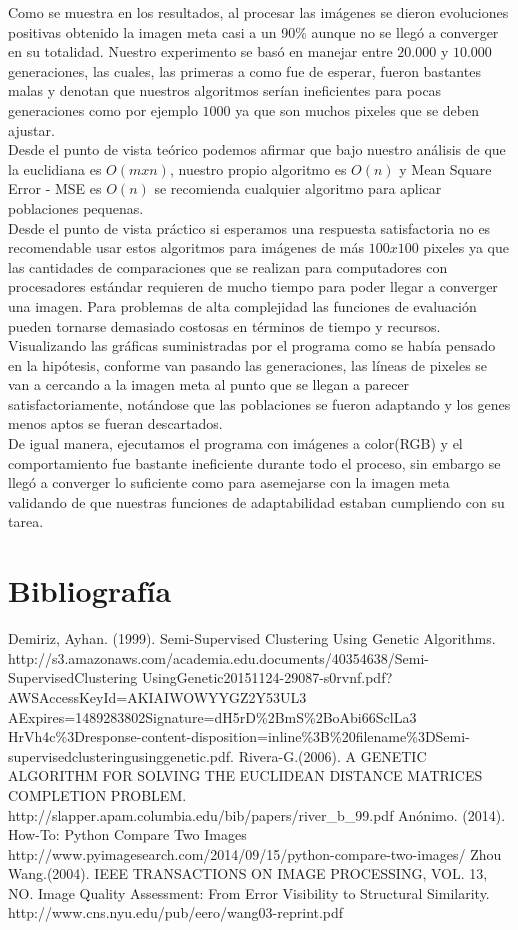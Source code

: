 \documentclass[letterpaper, 10 pt, conference]{ieeeconf}  %
\begin{document}
\setlength{\parindent}{1cm}Como se muestra en los resultados, al procesar las im\'agenes se dieron evoluciones positivas obtenido la imagen meta casi a un 90\%  aunque no se lleg\'o a converger en su totalidad. Nuestro experimento se bas\'o en manejar entre $20.000$ y $10.000$ generaciones, las cuales, las primeras a como fue de esperar, fueron bastantes malas y denotan que nuestros algoritmos ser\'ian ineficientes para pocas generaciones como por ejemplo $1000$ ya que son muchos pixeles que se deben ajustar. \\
\indent Desde el punto de vista te\'orico podemos afirmar que bajo nuestro análisis de que la euclidiana es $O(mxn)$, nuestro propio algoritmo es $O(n)$ y Mean Square Error - MSE es $O(n)$ se recomienda cualquier algoritmo para aplicar poblaciones pequenas.\\
\indent Desde el punto de vista pr\'actico si esperamos una respuesta satisfactoria no es recomendable usar estos algoritmos para im\'agenes de m\'as $100 x 100$ pixeles ya que las cantidades de comparaciones que se realizan para computadores con procesadores est\'andar requieren de mucho tiempo para poder llegar a converger una imagen. Para problemas de alta complejidad las funciones de evaluaci\'on pueden tornarse demasiado costosas en t\'erminos de tiempo y recursos.\\
\indent Visualizando las gr\'aficas suministradas por el programa como se hab\'ia pensado en la hip\'otesis, conforme van pasando las generaciones, las l\'ineas de pixeles se van a cercando a la imagen meta al punto que se llegan a parecer satisfactoriamente, not\'andose que las poblaciones se fueron adaptando y los genes menos aptos se fueran descartados.\\
\indent De igual manera, ejecutamos el programa con im\'agenes a color(RGB) y el comportamiento fue bastante ineficiente durante todo el proceso, sin embargo se lleg\'o a converger lo suficiente como para asemejarse con la imagen meta validando de que nuestras funciones de adaptabilidad estaban cumpliendo con su tarea.\\

\section{\textbf{Bibliograf\'ia}}
\indent Demiriz, Ayhan. (1999). Semi-Supervised Clustering Using Genetic Algorithms. http://s3.amazonaws.com/academia.edu.documents/40354638/Semi-SupervisedClustering UsingGenetic20151124-29087-s0rvnf.pdf?AWSAccessKeyId=AKIAIWOWYYGZ2Y53UL3 AExpires=1489283802Signature=dH5rD\%2BmS\%2BoAbi66SclLa3 HrVh4c\%3Dresponse-content-disposition=inline\%3B\%20filename\%3DSemi-supervisedclusteringusinggenetic.pdf.
\indent Rivera-G.(2006). A GENETIC ALGORITHM FOR SOLVING THE EUCLIDEAN DISTANCE MATRICES COMPLETION PROBLEM. http://slapper.apam.columbia.edu/bib/papers/river\_b\_99.pdf
\indent Anónimo. (2014). How-To: Python Compare Two Images http://www.pyimagesearch.com/2014/09/15/python-compare-two-images/
\indent Zhou Wang.(2004). IEEE TRANSACTIONS ON IMAGE PROCESSING, VOL. 13, NO. Image Quality Assessment: From Error Visibility to Structural Similarity. http://www.cns.nyu.edu/pub/eero/wang03-reprint.pdf
\end{document}
